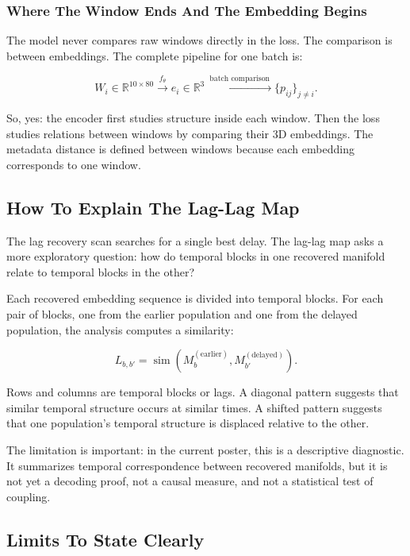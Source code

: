 \documentclass[11pt]{article}
\begin{document}
\subsubsection{Where The Window Ends And The Embedding Begins}

The model never compares raw windows directly in the loss. The comparison is
between embeddings. The complete pipeline for one batch is:

\begin{equation}
W_i \in \mathbb{R}^{10 \times 80}
\xrightarrow{\ f_\theta\ }
e_i \in \mathbb{R}^{3}
\xrightarrow{\ \text{batch comparison}\ }
\{p_{ij}\}_{j\ne i}.
\end{equation}

So, yes: the encoder first studies structure inside each window. Then the
loss studies relations between windows by comparing their 3D embeddings. The
metadata distance is defined between windows because each embedding
corresponds to one window.

\subsection{How To Explain The Lag-Lag Map}

The lag recovery scan searches for a single best delay. The lag-lag map asks a
more exploratory question: how do temporal blocks in one recovered manifold
relate to temporal blocks in the other?

Each recovered embedding sequence is divided into temporal blocks. For each
pair of blocks, one from the earlier population and one from the delayed
population, the analysis computes a similarity:

\begin{equation}
L_{b,b'}
=
\operatorname{sim}
\left(
M_b^{(\text{earlier})},
M_{b'}^{(\text{delayed})}
\right).
\end{equation}

Rows and columns are temporal blocks or lags. A diagonal pattern suggests that
similar temporal structure occurs at similar times. A shifted pattern suggests
that one population's temporal structure is displaced relative to the other.

The limitation is important: in the current poster, this is a descriptive
diagnostic. It summarizes temporal correspondence between recovered manifolds,
but it is not yet a decoding proof, not a causal measure, and not a statistical
test of coupling.

\subsection{Limits To State Clearly}
\end{document}
